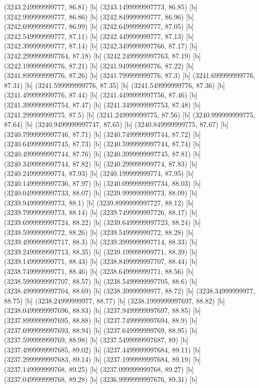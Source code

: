 {{{(3243.249999999777, 86.81) [b] 
(3243.1499999997773, 86.85) [b] 
(3242.999999999777, 86.86) [b] 
(3242.849999999777, 86.96) [b] 
(3242.699999999777, 86.99) [b] 
(3242.649999999777, 87.05) [b] 
(3242.549999999777, 87.11) [b] 
(3242.449999999777, 87.13) [b] 
(3242.399999999777, 87.14) [b] 
(3242.3499999997766, 87.17) [b] 
(3242.2999999997764, 87.18) [b] 
(3242.2499999997763, 87.19) [b] 
(3242.199999999776, 87.21) [b] 
(3241.949999999776, 87.22) [b] 
(3241.899999999776, 87.26) [b] 
(3241.799999999776, 87.3) [b] 
(3241.699999999776, 87.31) [b] 
(3241.599999999776, 87.35) [b] 
(3241.549999999776, 87.36) [b] 
(3241.499999999776, 87.44) [b] 
(3241.4499999997756, 87.46) [b] 
(3241.3999999997754, 87.47) [b] 
(3241.3499999997753, 87.48) [b] 
(3241.299999999775, 87.5) [b] 
(3241.249999999775, 87.56) [b] 
(3240.999999999775, 87.64) [b] 
(3240.9499999997747, 87.65) [b] 
(3240.849999999775, 87.67) [b] 
(3240.7999999997746, 87.71) [b] 
(3240.7499999997744, 87.72) [b] 
(3240.6499999997745, 87.73) [b] 
(3240.5999999997744, 87.74) [b] 
(3240.4999999997744, 87.76) [b] 
(3240.3999999997745, 87.81) [b] 
(3240.3499999997744, 87.82) [b] 
(3240.299999999774, 87.83) [b] 
(3240.249999999774, 87.93) [b] 
(3240.199999999774, 87.95) [b] 
(3240.1499999997736, 87.97) [b] 
(3240.0999999997734, 88.03) [b] 
(3240.0499999997733, 88.07) [b] 
(3239.999999999773, 88.09) [b] 
(3239.949999999773, 88.1) [b] 
(3239.8999999997727, 88.12) [b] 
(3239.799999999773, 88.14) [b] 
(3239.7499999997726, 88.17) [b] 
(3239.6999999997724, 88.22) [b] 
(3239.6499999997723, 88.24) [b] 
(3239.599999999772, 88.26) [b] 
(3239.549999999772, 88.28) [b] 
(3239.4999999997717, 88.3) [b] 
(3239.3999999997714, 88.33) [b] 
(3239.2499999997713, 88.35) [b] 
(3239.199999999771, 88.39) [b] 
(3239.149999999771, 88.43) [b] 
(3238.8499999997707, 88.44) [b] 
(3238.749999999771, 88.46) [b] 
(3238.649999999771, 88.56) [b] 
(3238.5999999997707, 88.57) [b] 
(3238.5499999997705, 88.6) [b] 
(3238.4999999997704, 88.69) [b] 
(3238.39999999977, 88.72) [b] 
(3238.34999999977, 88.75) [b] 
(3238.24999999977, 88.77) [b] 
(3238.1999999997697, 88.82) [b] 
(3238.0499999997696, 88.83) [b] 
(3237.9499999997697, 88.85) [b] 
(3237.8999999997695, 88.88) [b] 
(3237.7499999997694, 88.9) [b] 
(3237.6999999997693, 88.94) [b] 
(3237.649999999769, 88.95) [b] 
(3237.599999999769, 88.98) [b] 
(3237.5499999997687, 89) [b] 
(3237.4999999997685, 89.02) [b] 
(3237.4499999997684, 89.11) [b] 
(3237.2999999997683, 89.14) [b] 
(3237.1999999997684, 89.19) [b] 
(3237.149999999768, 89.25) [b] 
(3237.099999999768, 89.27) [b] 
(3237.049999999768, 89.28) [b] 
(3236.9999999997676, 89.31) [b] 
}}}
